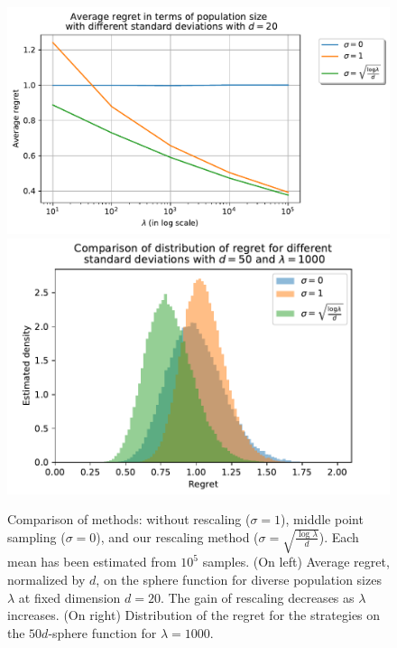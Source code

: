 \begin{figure}[t]
    \centering
    \includegraphics[trim=5 5 5 5,clip,width=.5\textwidth]{sections/appendix/ppsn2020-rescaling/figures/fig_rescaling_sphere_d_fixed.pdf}
    \includegraphics[width=.44\textwidth]{sections/appendix/ppsn2020-rescaling/figures/fig_boxplot_1000.pdf}   \\ 
\caption{Comparison of methods: without rescaling ($\sigma=1$), middle point sampling ($\sigma = 0$), and our rescaling method ($\sigma=\sqrt{\frac{\log\lambda}{d}}$). Each mean has been estimated from $10^5$ samples. (On left) Average regret, normalized by $d$, on the sphere function for diverse population sizes $\lambda$ at fixed dimension $d=20$. The gain of rescaling decreases as $\lambda$ increases.  (On right) Distribution of the regret for the strategies on the $50d$-sphere function for $\lambda=1000$. %
}
\label{fig:boxplots}
\end{figure}
